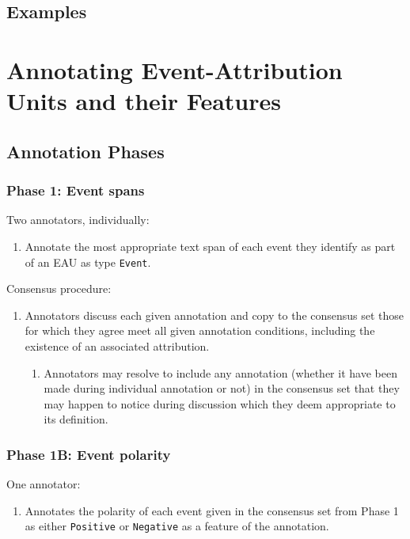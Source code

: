 \documentclass[a4paper,12pt]{article}
\begin{document}
    \subsection{Examples}

\pagebreak
\section{Annotating Event-Attribution Units and their Features}

    \subsection{Annotation Phases}
    \subsubsection{Phase 1: Event spans}
    Two annotators, individually:
        \begin{enumerate}
            \item Annotate the most appropriate text span of each event they identify as part of an EAU as type \texttt{Event}.
        \end{enumerate}
    Consensus procedure:
        \begin{enumerate}
            \item Annotators discuss each given annotation and copy to the consensus set those for which they agree meet all given annotation conditions, including the existence of an associated attribution.
                \begin{enumerate}
                    \item Annotators may resolve to include any annotation (whether it have been made during individual annotation or not) in the consensus set that they may happen to notice during discussion which they deem appropriate to its definition.
                \end{enumerate}
        \end{enumerate}


    \subsubsection{Phase 1B: Event polarity}
    One annotator:
        \begin{enumerate}
            \item Annotates the polarity of each event given in the consensus set from Phase 1 as either \texttt{Positive} or \texttt{Negative} as a feature of the annotation.
        \end{enumerate}
\end{document}
